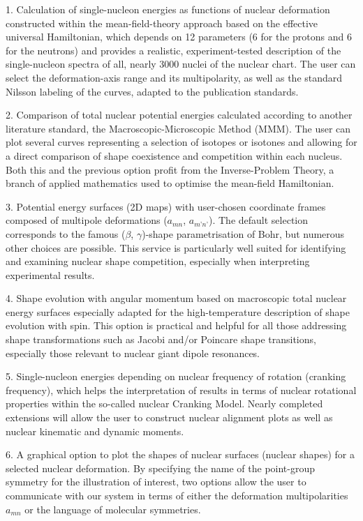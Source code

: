 1. Calculation of single-nucleon energies as functions of nuclear deformation constructed within the mean-field-theory approach based on the effective universal Hamiltonian, which depends on 12 parameters (6 for the protons and 6 for the neutrons) and provides a realistic, experiment-tested description of the single-nucleon spectra of all, nearly 3000 nuclei of the nuclear chart. The user can select the deformation-axis range and its multipolarity, as well as the standard Nilsson labeling of the curves, adapted to the publication standards.

2. Comparison of total nuclear potential energies calculated according to another literature standard, the Macroscopic-Microscopic Method (MMM). The user can plot several curves representing a selection of isotopes or isotones and allowing for a direct comparison of shape coexistence and competition within each nucleus. Both this and the previous option profit from the Inverse-Problem Theory, a branch of applied mathematics used to optimise the mean-field Hamiltonian.

3. Potential energy surfaces (2D maps) with user-chosen coordinate frames composed of multipole deformations ($a_{mn}$, $a_{m’n’}$). The default selection corresponds to the famous ($\beta$, $\gamma$)-shape parametrisation of Bohr, but numerous other choices are possible. This service is particularly well suited for identifying and examining nuclear shape competition, especially when interpreting experimental results.

4. Shape evolution with angular momentum based on macroscopic total nuclear energy surfaces especially adapted for the high-temperature description of shape evolution with spin. This option is practical and helpful for all those addressing shape transformations such as Jacobi and/or Poincare shape transitions, especially those relevant to nuclear giant dipole resonances.

5. Single-nucleon energies depending on nuclear frequency of rotation (cranking frequency), which helps the interpretation of results in terms of nuclear rotational properties within the so-called nuclear Cranking Model. Nearly completed extensions will allow the user to construct nuclear alignment plots as well as nuclear kinematic and dynamic moments. 

6. A graphical option to plot the shapes of nuclear surfaces (nuclear shapes) for a selected nuclear deformation.  By specifying the name of the point-group symmetry for the illustration of interest, two options allow the user to communicate with our system in terms of either the deformation multipolarities {$a_{mn}$} or the language of molecular symmetries.

